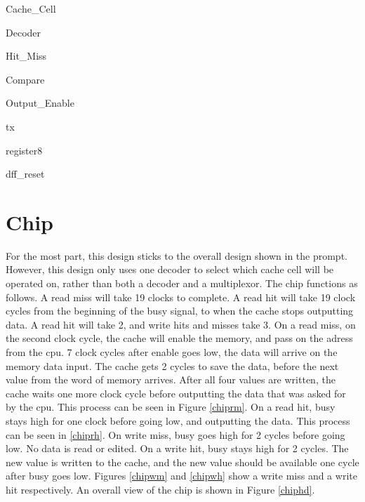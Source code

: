 \documentclass[10pt]{article}
\begin{document}
\begin{longenum}
\begin{longenum}
\begin{longenum}
\begin{longenum}
\begin{longenum}
                    \item Cache_Cell
                    \end{longenum}
                \end{longenum}
            \end{longenum}
        \item Decoder
        \item Hit_Miss
            \begin{longenum}
            \item Compare
            \end{longenum}
        \item Output_Enable
            \begin{longenum}
            \item tx
            \end{longenum}
        \item register8
            \begin{longenum}
            \item dff_reset
            \end{longenum}
        \end{longenum}
    \end{longenum}
\section{Chip}
    For the most part, this design sticks to the overall design shown in the
prompt. However, this design only uses one decoder to select which cache cell
will be operated on, rather than both a decoder and a multiplexor. The chip
functions as follows. A read miss will take 19 clocks to complete. A read hit
will take 19 clock cycles from the beginning of the busy signal, to when the
cache stops outputting data. A read hit will take 2, and write hits and misses
take 3. On a read miss, on the second clock cycle, the cache will enable the
memory, and pass on the adress from the cpu. 7 clock cycles after enable goes
low, the data will arrive on the memory data input. The cache gets 2 cycles to
save the data, before the next value from the word of memory arrives. After all
four values are written, the cache waits one more clock cycle before outputting
the data that was asked for by the cpu. This process can be seen in Figure
\ref{chiprm}. On a read hit, busy stays high for one clock before going low, and
outputting the data. This process can be seen in \ref{chiprh}. On write miss,
busy goes high for 2 cycles before going low. No data is read or edited. On a
write hit, busy stays high for 2 cycles. The new value is written to the cache,
and the new value should be available one cycle after busy goes low. Figures
\ref{chipwm} and \ref{chipwh} show a write miss and a write hit respectively. An
overall view of the chip is shown in Figure \ref{chiphd}.
\end{document}
